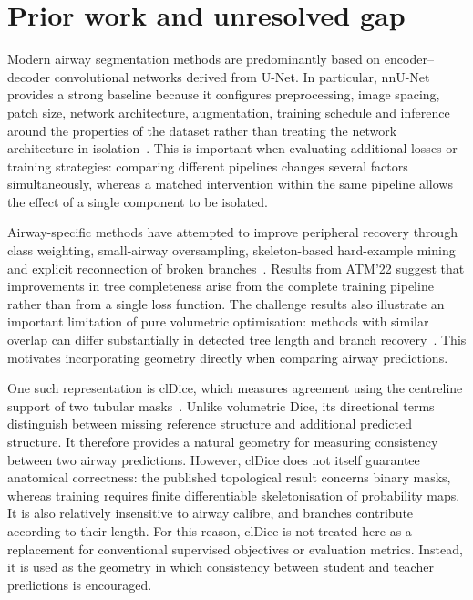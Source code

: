 \section{Prior work and unresolved gap}

Modern airway segmentation methods are predominantly based on encoder--decoder convolutional
networks derived from U-Net. In particular, nnU-Net provides a strong baseline because it
configures preprocessing, image spacing, patch size, network architecture, augmentation,
training schedule and inference around the properties of the dataset rather than treating the
network architecture in isolation~\cite{isensee2021nnunet}. This is important when evaluating additional
losses or training strategies: comparing different pipelines changes several factors
simultaneously, whereas a matched intervention within the same pipeline allows the effect of a
single component to be isolated.

Airway-specific methods have attempted to improve peripheral recovery through class weighting,
small-airway oversampling, skeleton-based hard-example mining and explicit reconnection of
broken branches~\cite{qin2019airwaynet,yu2022break,zhang2023atm22}. Results from ATM'22 suggest
that improvements in tree completeness arise from the complete training pipeline rather than
from a single loss function. The challenge results also illustrate an important limitation of
pure volumetric optimisation: methods with similar overlap can differ substantially in detected
tree length and branch recovery~\cite{zhang2023atm22}. This motivates incorporating geometry
directly when comparing airway predictions.

One such representation is clDice, which measures agreement using the centreline support of
two tubular masks~\cite{shit2021cldice}. Unlike volumetric Dice, its directional terms distinguish
between missing reference structure and additional predicted structure. It therefore provides
a natural geometry for measuring consistency between two airway predictions. However, clDice
does not itself guarantee anatomical correctness: the published topological result concerns
binary masks, whereas training requires finite differentiable skeletonisation of probability
maps. It is also relatively insensitive to airway calibre, and branches contribute according to
their length. For this reason, clDice is not
treated here as a replacement for conventional supervised objectives or evaluation metrics.
Instead, it is used as the geometry in which consistency between student and teacher
predictions is encouraged.

